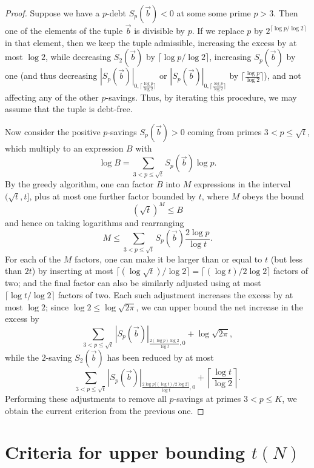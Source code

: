 \documentclass[12pt,a4paper,reqno]{amsart}
\numberwithin{equation}{section}
\theoremstyle{plain}
\theoremstyle{definition}
\begin{document}
\begin{proof} Suppose we have a $p$-debt $S_p(\vec b) < 0$ at some some prime $p>3$.  Then one of the elements of the tuple $\vec b$ is divisible by $p$.  If we replace $p$ by $2^{\lceil \log p/\log 2 \rceil}$ in that element, then we keep the tuple admissible, increasing the excess by at most $\log 2$, while decreasing $S_2(\vec b)$ by $\lceil \log p/\log 2 \rceil$, increasing $S_p(\vec b)$ by one (and thus decreasing $|S_p(\vec b)|_{0,\lceil \frac{\log p}{\log 2} \rceil}$ or $|S_p(\vec b)|_{0,\lceil \frac{\log p}{\log 2} \rceil}$ by $\lceil \frac{\log p}{\log 2} \rceil$), and not affecting any of the other $p$-savings.  Thus, by iterating this procedure, we may assume that the tuple is debt-free.

  Now consider the positive $p$-savings $S_p(\vec b)>0$ coming from primes $3 < p \leq \sqrt{t}$, which multiply to an expression $B$ with 
  $$\log B = \sum_{3 < p \leq \sqrt{t}} S_p(\vec b) \log p.$$
  By the greedy algorithm, one can factor $B$ into $M$ expressions in the interval $(\sqrt{t},t]$, plus at most one further factor bounded by $t$, where $M$ obeys the bound
  $$ \left(\sqrt{t}\right)^M \leq B$$
  and hence on taking logarithms and rearranging
  $$ M \leq \sum_{3 < p \leq \sqrt{t}} S_p(\vec b)  \frac{2 \log p}{\log t}.$$
For each of the $M$ factors, one can make it be larger than or equal to $t$ (but less than $2t$) by inserting at most $\lceil (\log \sqrt{t})/\log 2 \rceil = \lceil (\log t) / 2 \log 2 \rceil$ factors of two; and the final factor can also be similarly adjusted using at most $\lceil \log t/\log 2\rceil$ factors of two.  Each such adjustment increases the excess by at most $\log 2$; since $\log 2 \leq \log \sqrt{2\pi}$, we can upper bound the net increase in the excess by
$$ \sum_{3 < p \leq \sqrt{t}} |S_p(\vec b)|_{\frac{2 (\log p) \log 2}{\log t}, 0} + \log \sqrt{2\pi},$$
while the $2$-saving $S_2(\vec b)$ has been reduced by at most
$$ \sum_{3 < p \leq \sqrt{t}} |S_p(\vec b)|_{\frac{2 \log p \lceil (\log t)/2\log 2 \rceil}{\log t}, 0} + \left \lceil \frac{\log t}{\log 2} \right \rceil.$$
Performing these adjustments to remove all $p$-savings at primes $3 < p \leq K$, we obtain the current criterion from the previous one.
\end{proof}
  
  
\section{Criteria for upper bounding $t(N)$}
\end{document}
